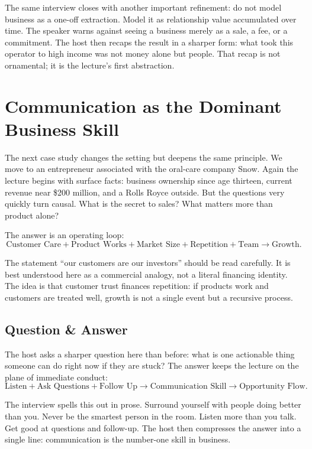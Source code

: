 The same interview closes with another important refinement: do not model business as a one-off extraction. Model it as relationship value accumulated over time. The speaker warns against seeing a business merely as a sale, a fee, or a commitment. The host then recaps the result in a sharper form: what took this operator to high income was not money alone but people. That recap is not ornamental; it is the lecture's first abstraction.

\section{Communication as the Dominant Business Skill}

The next case study changes the setting but deepens the same principle. We move to an entrepreneur associated with the oral-care company Snow. Again the lecture begins with surface facts: business ownership since age thirteen, current revenue near \$200 million, and a Rolls Royce outside. But the questions very quickly turn causal. What is the secret to sales? What matters more than product alone?

The answer is an operating loop:
\begin{equation}
\text{Customer Care}+\text{Product Works}+\text{Market Size}+\text{Repetition}+\text{Team} \to \text{Growth}.
\end{equation}

The statement ``our customers are our investors'' should be read carefully. It is best understood here as a commercial analogy, not a literal financing identity. The idea is that customer trust finances repetition: if products work and customers are treated well, growth is not a single event but a recursive process.

\subsection{Question \& Answer}

The host asks a sharper question here than before: what is one actionable thing someone can do right now if they are stuck? The answer keeps the lecture on the plane of immediate conduct:
\begin{equation}
\text{Listen}+\text{Ask Questions}+\text{Follow Up}
\to
\text{Communication Skill}
\to
\text{Opportunity Flow}.
\end{equation}

The interview spells this out in prose. Surround yourself with people doing better than you. Never be the smartest person in the room. Listen more than you talk. Get good at questions and follow-up. The host then compresses the answer into a single line: communication is the number-one skill in business.

